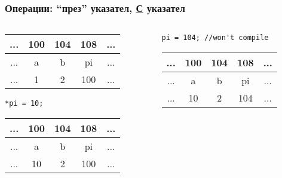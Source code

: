 \documentclass{beamer}
\begin{document}
\begin{frame}[fragile]
\frametitle{Операции: ``през'' указател, \underline{С} указател}


\begin{columns}[t]
  \begin{column}{0.5\textwidth}

\begin{center}
  
\begin{tabular}{c | c | c | c | c}
... & 100 & 104 & 108 & ...\\\hline
... & a   & b   & pi  & ... \\\hline
... & 1   & 2   & 100 & ... \\
  
\end{tabular}
\end{center}


\begin{flushleft}
\begin{lstlisting}
*pi = 10;
\end{lstlisting}
\end{flushleft}

\pause

\begin{center}
  
\begin{tabular}{c | c | c | c | c}
... & 100 & 104 & 108 & ...\\\hline
... & a   & b   & pi  & ... \\\hline
... & \alert{10}   & 2   & 100 & ... \\
  
\end{tabular}
\end{center}


  \end{column}
  \begin{column}{0.5\textwidth}

\pause
\begin{flushleft}
\begin{lstlisting}
pi = 104; //won't compile
\end{lstlisting}
\end{flushleft}

\begin{center}
  
\pause

\begin{tabular}{c | c | c | c | c}
... & 100 & 104 & 108 & ...\\\hline
... & a   & b   & pi  & ... \\\hline
... & 10  & 2   & \alert{104} & ... \\
  

\end{tabular}
\end{center}
\end{column}
\end{columns}
\end{frame}
\end{document}
